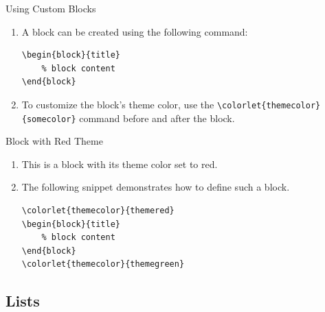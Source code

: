 \documentclass[8pt]{beamer}
\begin{document}
\begin{frame}[fragile]{\insertsection}{\insertsubsection}
    \begin{block}{Using Custom Blocks}
        \begin{enumerate}
            \item A block can be created using the following command:
            \begin{lstlisting}[style=latex]
\begin{block}{title}
    % block content
\end{block}
            \end{lstlisting}
            \item To customize the block's theme color, use the \lstinline|\colorlet{themecolor}{somecolor}| command before and after the block.
        \end{enumerate}
    \end{block}

    \begin{block}{Block with Red Theme}
        \begin{enumerate}
            \item This is a block with its theme color set to red.
            \item The following snippet demonstrates how to define such a block.
            \begin{lstlisting}[style=latex]
\colorlet{themecolor}{themered}
\begin{block}{title}
    % block content
\end{block}
\colorlet{themecolor}{themegreen}
            \end{lstlisting}
        \end{enumerate}
    \end{block}

\end{frame}

\subsection{Lists}
\end{document}
